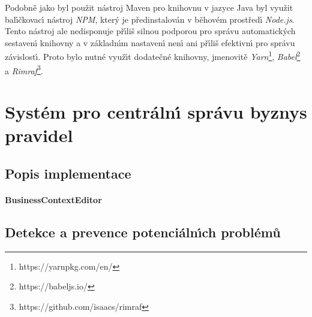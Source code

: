 Podobně jako byl použit nástroj Maven pro knihovnu v jazyce Java byl
využit bal\'{\i}čkovac\'{\i} nástroj \textit{NPM}, kter\'y je předinstalován
v běhovém prostřed\'{\i} \textit{Node.js}. Tento nástroj ale nedisponuje
př\'{\i}liš silnou podporou pro správu automatick\'ych sestaven\'{\i} knihovny
a v základn\'{\i}m nastaven\'{\i} nen\'{\i} ani př\'{\i}liš efektivn\'{\i} pro správu závislost\'{\i}.
Proto bylo nutné využ\'{\i}t dodatečné knihovny, jmenovitě
\textit{Yarn}\footnote{https://yarnpkg.com/en/}, \textit{Babel}\footnote{https://babeljs.io/} a
\textit{Rimraf}\footnote{https://github.com/isaacs/rimraf}.

\section{Systém pro centráln\'{\i} správu byznys pravidel}\label{sec:central-administration}



\subsection{Popis implementace}

\paragraph{BusinessContextEditor} %

\subsection{Detekce a prevence potenciáln\'{\i}ch problémů}

